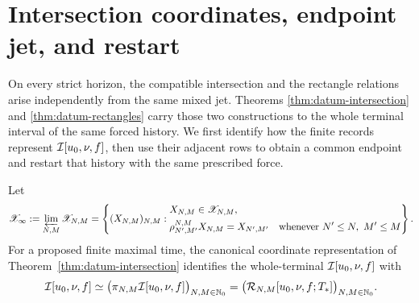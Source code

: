 \section{Intersection coordinates, endpoint jet, and restart}

On every strict horizon, the compatible intersection and the rectangle
relations arise independently from the same mixed jet. Theorems
\ref{thm:datum-intersection} and \ref{thm:datum-rectangles} carry those
two constructions to the whole terminal interval of the same forced history. We
first identify how the finite records represent \(\mathcal I[u_0,\nu,f]\), then use
their adjacent rows to obtain a common endpoint and restart that history with
the same prescribed force.


\begin{definition}
\label{def:compatible-intersection}
Let
\begin{equation}
 \mathscr X_\infty
 :=\varprojlim_{N,M}\mathscr X_{N,M}
 =\left\{(X_{N,M})_{N,M}:
 \begin{aligned}
 &X_{N,M}\in\mathscr X_{N,M},\\
 &\rho_{N',M'}^{N,M}X_{N,M}=X_{N',M'}
 \quad\text{whenever }N'\le N,\ M'\le M
 \end{aligned}
 \right\}.
 \label{eq:compatible-intersection-space}
\end{equation}
For a proposed finite maximal time, the canonical coordinate representation
of Theorem~\ref{thm:datum-intersection} identifies the whole-terminal
\(\mathcal I[u_0,\nu,f]\) with
\begin{equation}
 \mathcal I[u_0,\nu,f]
 \simeq\bigl(\pi_{N,M}\mathcal I[u_0,\nu,f]\bigr)_{N,M\in\mathbb N_0}
 =\bigl(\mathcal R_{N,M}[u_0,\nu,f;T_*]\bigr)_{N,M\in\mathbb N_0}.
 \label{eq:compatible-intersection}
\end{equation}
\end{definition}

